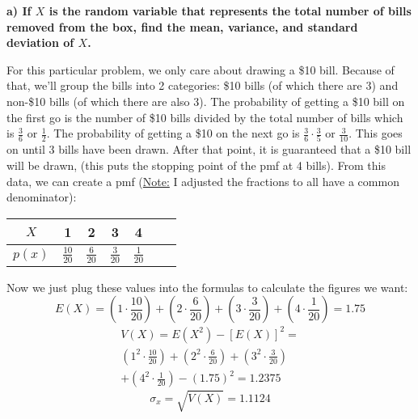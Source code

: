 \documentclass[12pt, letter]{article}
\begin{document}
\qquad \textbf{a) If $X$ is the random variable that represents the total number of bills removed from the box, find the mean, variance, and standard deviation of $X$.}
\begin{center}
	For this particular problem, we only care about drawing a \$10 bill. Because of that, we'll group the bills into 2 categories: \$10 bills (of which there are 3) and non-\$10 bills (of which there are also 3). The probability of getting a \$10 bill on the first go is the number of \$10 bills divided by the total number of bills which is $\frac{3}{6}$ or $\frac{1}{2}$. The probability of getting a \$10 on the next go is $\frac{3}{6} \cdot \frac{3}{5}$ or $\frac{3}{10}$. This goes on until 3 bills have been drawn. After that point, it is guaranteed that a \$10 bill will be drawn, (this puts the stopping point of the pmf at 4 bills). From this data, we can create a pmf (\underline{Note:} I adjusted the fractions to all have a common denominator):
	\linebreak
	\linebreak
	\def\arraystretch{1.5}
	\begin{tabular}{|c|c|c|c|c|c|c|}
		\hline
		$X$ & 1 & 2 & 3 & 4 \\
		\hline
		$p(x)$ & $\frac{10}{20}$ & $\frac{6}{20}$ & $\frac{3}{20}$ & $\frac{1}{20}$ \\
		\hline
	\end{tabular}
	\linebreak
	\linebreak
	Now we just plug these values into the formulas to calculate the figures we want:
	$$E(X)=\left(1 \cdot \frac{10}{20}\right)+\left(2 \cdot \frac{6}{20}\right)+\left(3 \cdot \frac{3}{20}\right)+\left(4 \cdot \frac{1}{20}\right)=\boxed{1.75}$$
	\begin{multline*}
		V(X)=E(X^{2})-[E(X)]^{2}= \\
		\left(1^{2} \cdot \frac{10}{20}\right)+\left(2^{2} \cdot \frac{6}{20}\right)+\left(3^{2} \cdot \frac{3}{20}\right) \\
		+\left(4^{2} \cdot \frac{1}{20}\right)-(1.75)^{2}=\boxed{1.2375}
	\end{multline*}
	$$\sigma_{x}=\sqrt{V(X)}=\boxed{1.1124}$$
\end{center}

\pagebreak
\end{document}
